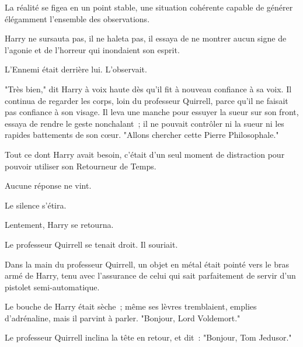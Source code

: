 La réalité se figea en un point stable, une situation cohérente capable de générer élégamment l'ensemble des observations.

Harry ne sursauta pas, il ne haleta pas, il essaya de ne montrer aucun signe de l'agonie et de l'horreur qui inondaient son esprit.

L'Ennemi était derrière lui. L'observait.

"Très bien," dit Harry à voix haute dès qu'il fit à nouveau confiance à sa voix. Il continua de regarder les corps, loin du professeur Quirrell, parce qu'il ne faisait pas confiance à son visage. Il leva une manche pour essuyer la sueur sur son front, essaya de rendre le geste nonchalant~; il ne pouvait contrôler ni la sueur ni les rapides battements de son cœur. "Allons chercher cette Pierre Philosophale."

Tout ce dont Harry avait besoin, c'était d'un seul moment de distraction pour pouvoir utiliser son Retourneur de Temps.

Aucune réponse ne vint.

Le silence s'étira.

Lentement, Harry se retourna.

Le professeur Quirrell se tenait droit. Il souriait.

Dans la main du professeur Quirrell, un objet en métal était pointé vers le bras armé de Harry, tenu avec l'assurance de celui qui sait parfaitement de servir d'un pistolet semi-automatique.

Le bouche de Harry était sèche~; même ses lèvres tremblaient, emplies d'adrénaline, mais il parvint à parler. "Bonjour, Lord Voldemort."

Le professeur Quirrell inclina la tête en retour, et dit~: "Bonjour, Tom Jedusor." 


